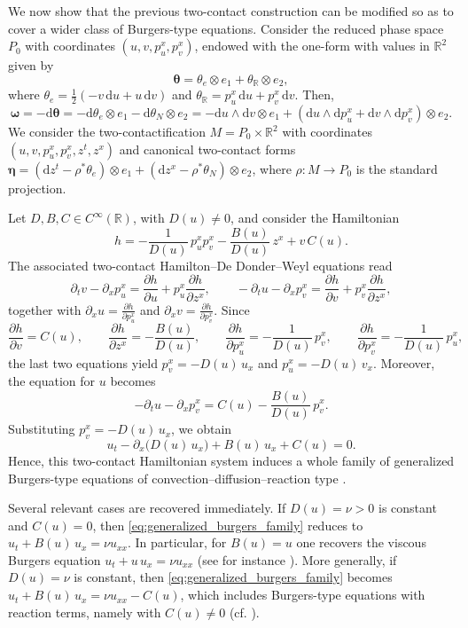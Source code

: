 \documentclass[11pt,a4paper]{article}
\newcommand{\dd}{\mathrm{d}}
\theoremstyle{plain} \newtheorem{theorem}{Theorem}[section] \newtheorem{proposition}[theorem]{Proposition} \newtheorem{corollary}[theorem]{Corollary} \newtheorem{lemma}[theorem]{Lemma} \theoremstyle{definition} \newtheorem{definition}[theorem]{Definition} \theoremstyle{remark} \newtheorem{remark}[theorem]{Remark} \newtheorem{example}[theorem]{Example} %
\begin{document}
We now show that the previous two-contact construction can be modified so as to cover a wider class of Burgers-type equations. Consider the reduced phase space \(P_0\) with coordinates \((u,v,p_u^x,p_v^x)\), endowed with the one-form with values in $\mathbb{R}^2$ given by
$$
\bm \theta=\theta_e\otimes e_1+\theta_\mathbb{R}\otimes e_2,
$$
where
\(\theta_e=\frac12(-v\,\dd u+u\,\dd v)\) and \(\theta_\mathbb{R}=p_u^x\,\dd u+p_v^x\,\dd v\). Then, 
\[
\bm\omega=-\dd \bm\theta=-\dd\theta_e\otimes e_1-\dd\theta_N \otimes e_2=-\dd u\wedge \dd v\otimes e_1+(\dd u\wedge \dd p_u^x+\dd v\wedge \dd p_v^x)\otimes e_2.
\]
We consider the two-contactification \(M=P_0\times\mathbb R^2\) with coordinates \((u,v,p_u^x,p_v^x,z^t,z^x)\) and canonical two-contact forms \(\bm\eta= (\dd z^t-\rho^*\theta_e)\otimes e_1+(\dd z^x-\rho^*\theta_N)\otimes e_2\), where $\rho:M\rightarrow P_0$ is the standard projection.

Let \(D,B,C\in C^\infty(\mathbb R)\), with \(D(u)\neq0\), and consider the Hamiltonian
\[
h=
-\frac{1}{D(u)}\,p_u^x p_v^x-\frac{B(u)}{D(u)}\,z^x+v\,C(u).
\]
The associated two-contact Hamilton--De Donder--Weyl equations read
\[
\partial_t v-\partial_x p_u^x=\frac{\partial h}{\partial u}+p_u^x\frac{\partial h}{\partial z^x},\qquad
-\partial_t u-\partial_x p_v^x=\frac{\partial h}{\partial v}+p_v^x\frac{\partial h}{\partial z^x},
\]
together with \(\partial_x u=\frac{\partial h}{\partial p_u^x}\) and \(\partial_x v=\frac{\partial h}{\partial p_v^x}\). Since
\[
\frac{\partial h}{\partial v}=C(u),\qquad
\frac{\partial h}{\partial z^x}=-\frac{B(u)}{D(u)},\qquad
\frac{\partial h}{\partial p_u^x}=-\frac{1}{D(u)}\,p_v^x,\qquad
\frac{\partial h}{\partial p_v^x}=-\frac{1}{D(u)}\,p_u^x,
\]
the last two equations yield \(p_v^x=-D(u)\,u_x\) and \(p_u^x=-D(u)\,v_x\). Moreover, the equation for \(u\) becomes
\[
-\partial_t u-\partial_x p_v^x=C(u)-\frac{B(u)}{D(u)}\,p_v^x.
\]
Substituting \(p_v^x=-D(u)\,u_x\), we obtain
\begin{equation}\label{eq:generalized_burgers_family}
u_t-\partial_x\bigl(D(u)\,u_x\bigr)+B(u)\,u_x+C(u)=0.
\end{equation}
Hence, this two-contact Hamiltonian system induces a whole family of generalized Burgers-type equations of convection--diffusion--reaction type \cite{PopovicPtashnykSattar2025}.

Several relevant cases are recovered immediately. If \(D(u)=\nu>0\) is constant and \(C(u)=0\), then \eqref{eq:generalized_burgers_family} reduces to \(u_t+B(u)\,u_x=\nu u_{xx}\). In particular, for \(B(u)=u\) one recovers the viscous Burgers equation \(u_t+u\,u_x=\nu u_{xx}\) (see for instance \cite{Salih2016BurgersEquation}). More generally, if \(D(u)=\nu\) is constant, then \eqref{eq:generalized_burgers_family} becomes \(u_t+B(u)\,u_x=\nu u_{xx}-C(u)\), which includes Burgers-type equations with reaction terms, namely with $C(u)\neq 0$ (cf. \cite{KayaElSayed2004}).
\end{document}
